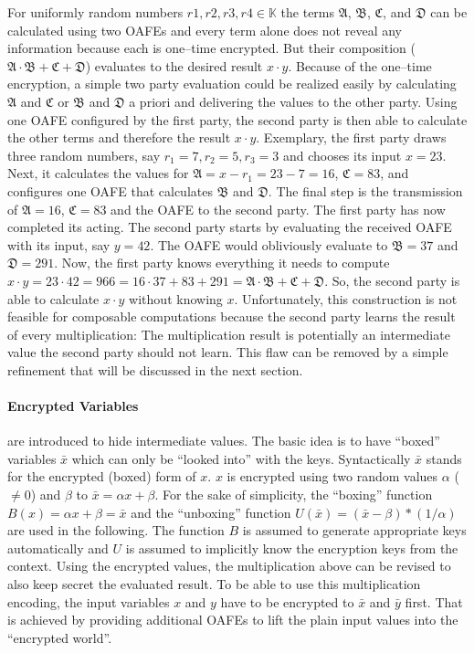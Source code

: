 \noindent{}For uniformly random numbers $r1, r2, r3, r4 \in \mathbb{K}$ the
terms $\mathfrak{A}$, $\mathfrak{B}$, $\mathfrak{C}$, and $\mathfrak{D}$ can be
calculated using two OAFEs and every term alone does not reveal any information
because each is one--time encrypted. But their composition ($\mathfrak{A} \cdot
\mathfrak{B} + \mathfrak{C} + \mathfrak{D}$) evaluates to the desired result $x
\cdot y$. Because of the one--time encryption, a simple two party evaluation
could be realized easily by calculating $\mathfrak{A}$ and $\mathfrak{C}$ or
$\mathfrak{B}$ and $\mathfrak{D}$ a priori and delivering the values to the
other party. Using one OAFE configured by the first party, the second party is
then able to calculate the other terms and therefore the result $x \cdot y$.
Exemplary, the first party draws three random numbers, say $r_1=7, r_2=5, r_3=3$
and chooses its input $x=23$. Next, it calculates the values for $\mathfrak{A} =
x - r_1 = 23 - 7 = 16$, $\mathfrak{C} = 83$, and configures one OAFE that
calculates $\mathfrak{B}$ and $\mathfrak{D}$. The final step is the transmission
of $\mathfrak{A} = 16$, $\mathfrak{C} = 83$ and the OAFE to the second party.
The first party has now completed its acting. The second party starts by
evaluating the received OAFE with its input, say $y = 42$. The OAFE would
obliviously evaluate to $\mathfrak{B} = 37$ and $\mathfrak{D} = 291$. Now, the
first party knows everything it needs to compute $x \cdot y = 23 \cdot 42 = 966
= 16 \cdot 37 + 83 + 291 = \mathfrak{A} \cdot \mathfrak{B} + \mathfrak{C} +
\mathfrak{D}$. So, the second party is able to calculate $x \cdot y$ without
knowing $x$.  Unfortunately, this construction is not feasible for composable
computations because the second party learns the result of every multiplication:
The multiplication result is potentially an intermediate value the second
party should not learn. This flaw can be removed by a simple refinement that
will be discussed in the next section.


\paragraph{Encrypted Variables} are introduced to hide intermediate values. The
basic idea is to have ``boxed'' variables $\bar{x}$ which can only be ``looked
into'' with the keys. Syntactically $\bar{x}$ stands for the encrypted (boxed)
form of $x$. $x$ is encrypted using two random values $\alpha$ ($\neq 0$) and
$\beta$ to $\bar{x} = \alpha x + \beta$.  For the sake of simplicity, the
``boxing'' function $B(x) = \alpha x + \beta = \bar{x}$ and the ``unboxing''
function $U(\bar{x}) = (\bar{x}-\beta)*(1/\alpha)$ are used in the following.
The function $B$ is assumed to generate appropriate keys automatically and $U$
is assumed to implicitly know the encryption keys from the context. Using the
encrypted values, the multiplication above can be revised to also keep secret
the evaluated result. To be able to use this multiplication encoding, the input
variables $x$ and $y$ have to be encrypted to $\bar{x}$ and $\bar{y}$ first.
That is achieved by providing additional OAFEs to lift the plain input values
into the ``encrypted world''.

